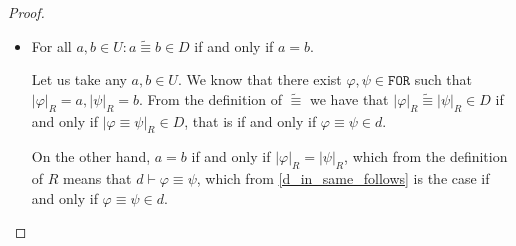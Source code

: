 \documentclass{article}
\theoremstyle{definition}
\theoremstyle{definition}
\theoremstyle{definition}
\newcommand*{\id}{\equiv}
\newcommand*{\ra}{\rightarrow}
\newcommand*{\FOR}{\texttt{FOR}}
\newcommand{\PC}{$\mathsf{PC}$\xspace}
\begin{document}
\begin{proof}
\begin{itemize}
\begin{itemize}
                        Let $\Psi$ be a proof of $\lnot \varphi \ra \hat{\varphi}$ in $d_{l-1}$ with a
                        proof of $\psi \ra \hat{\varphi}$ in $d_{j-1}$ appended to it. Then let us
                        append to $\Psi$ a formula $(\lnot \varphi \ra \hat{\varphi}) \ra ((\psi \ra
                            \hat{\varphi}) \ra ((\varphi \ra \psi)\ra \hat{\varphi}))$ which is an instance
                        of a \PC theorem $(\lnot \alpha \ra \gamma) \ra ((\beta \ra \gamma) \ra
                            ((\alpha \ra \beta) \ra \gamma))$. Them by \emph{modus ponens} we can infer
                        $(\psi \ra \hat{\varphi}) \ra ((\varphi \ra \psi)\ra \hat{\varphi})$ and
                        $(\varphi \ra \psi)\ra \hat{\varphi}$ arriving at the proof of $(\varphi \ra
                            \psi) \ra \hat{\varphi}$ in $d_{k-1}$, thus showing that $\varphi \ra \psi \not
                            \in d$.
              \end{itemize}
        \item For all $a, b \in U: a \tilde{\id}b \in D$ if and only if $a = b$.

              Let us take any $a,b \in U$. We know that there exist $\varphi, \psi \in \FOR$
              such that $|\varphi|_R = a, |\psi|_R = b$. From the definition of $\tilde{\id}$
              we have that $|\varphi|_R \tilde{\id} |\psi|_R \in D$ if and only if $|\varphi
                  \id \psi|_R \in D$, that is if and only if $\varphi \id \psi \in d$.

              On the other hand, $a = b$ if and only if $|\varphi|_R = |\psi|_R$, which from
              the definition of $R$ means that $d \vdash \varphi \id \psi$, which from
              \cref{d_in_same_follows} is the case if and only if $\varphi \id \psi \in d$.


\end{itemize}
\end{proof}
\end{document}
